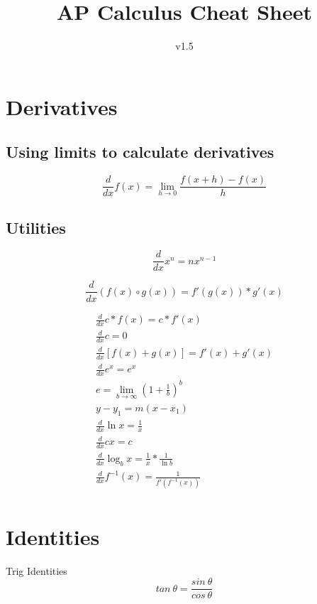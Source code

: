 \documentclass[12pt, english]{article}
\date{}
\title{ AP Calculus Cheat Sheet }
\begin{document}
\author{
	v1.5
}

\maketitle
\tableofcontents
\newpage

\section{Derivatives}
\subsection{Using limits to calculate derivatives}
	\begin{equation}
		\frac{d}{dx} f(x) = \lim_{h \to 0} \frac{f(x+h)-f(x)}{h}
	\end{equation}

\subsection{Utilities}
\begin{equation}
		\frac{d}{dx} x^n = nx^{n-1}
\end{equation}

\noindent
{}
\begin{equation}
		\frac{d}{dx} (f(x) \circ g(x)) = f'(g(x)) * g'(x)
\end{equation}

\begin{equation}
	\begin{aligned}
		\frac{d}{dx} c * f(x) = c * f'(x) \\
		\frac{d}{dx} c = 0 \\
		\frac{d}{dx} [f(x)+g(x)] = f'(x)+g'(x) \\
		\frac{d}{dx} e^x = e^x \\
		e = \lim_{b \to \infty} (1+\frac{1}{b})^b \\
		y-y_1 = m(x-x_1) \\
		\frac{d}{dx} \ln x = \frac{1}{x} \\
		\frac{d}{dx} cx = c \\
		\frac{d}{dx} \log_{b} x = \frac{1}{x} * \frac{1}{\ln b} \\
		\frac{d}{dx} f^{-1}(x) = \frac{1}{f'(f^{-1}(x))} \\
	\end{aligned}
\end{equation}

\section{Identities}
Trig Identities
\begin{equation}
	tan\ \theta = \frac{sin\ \theta}{cos\ \theta}
\end{equation}
\end{document}
